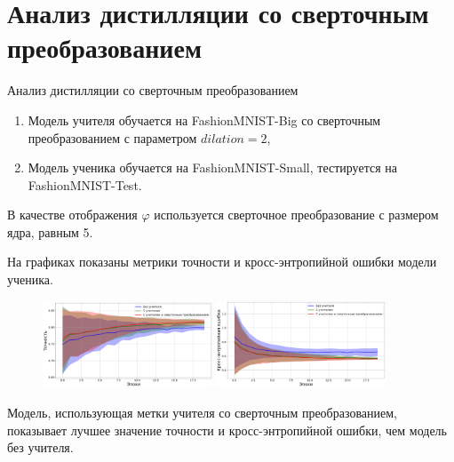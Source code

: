 \documentclass[10pt,pdf,hyperref={unicode}]{beamer}
\begin{document}
\section{Анализ дистилляции со сверточным преобразованием}
\begin{frame}{Анализ дистилляции со сверточным преобразованием}
\begin{enumerate}[1)]
    \item Модель учителя обучается на FashionMNIST-Big со сверточным преобразованием с параметром $dilation=2$,
    \item Модель ученика обучается на FashionMNIST-Small, тестируется на FashionMNIST-Test.
\end{enumerate}

\par
В качестве отображения $\varphi$ используется сверточное преобразование с размером ядра, равным 5.

На графиках показаны метрики точности и кросс-энтропийной ошибки модели ученика.

\begin{figure}[h!]
\includegraphics[width=0.45\textwidth]{results/dilation_acc.png}
\includegraphics[width=0.45\textwidth]{results/dilation_loss.png}
\end{figure}

Модель, использующая метки учителя со сверточным преобразованием, показывает лучшее значение точности и кросс-энтропийной ошибки, чем модель без учителя.

\end{frame}

\end{document}
